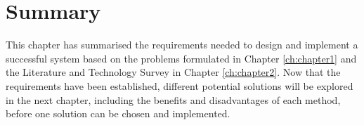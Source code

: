 \section{Summary}

This chapter has summarised the requirements needed to design and implement a successful system based on the problems formulated in Chapter \ref{ch:chapter1} and the Literature and Technology Survey in Chapter \ref{ch:chapter2}. Now that the requirements have been established, different potential solutions will be explored in the next chapter, including the benefits and disadvantages of each method, before one solution can be chosen and implemented.